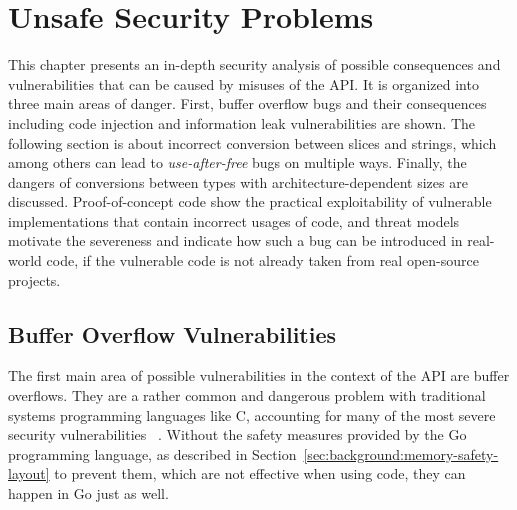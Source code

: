 
\chapter{Unsafe Security Problems}\label{ch:unsafe-security-problems}

This chapter presents an in-depth security analysis of possible consequences and vulnerabilities that can be caused by
misuses of the \unsafe{} \acrshort{API}.
It is organized into three main areas of danger.
First, buffer overflow bugs and their consequences including code injection and information leak vulnerabilities are
shown.
The following section is about incorrect conversion between slices and strings, which among others can lead to
\textit{use-after-free} bugs on multiple ways.
Finally, the dangers of conversions between types with architecture-dependent sizes are discussed.
Proof-of-concept code show the practical exploitability of vulnerable implementations that contain incorrect usages of
\unsafe{} code, and threat models motivate the severeness and indicate how such a bug can be introduced in real-world
code, if the vulnerable code is not already taken from real open-source projects.





\section{Buffer Overflow Vulnerabilities}\label{sec:unsafe-security-problems:buffer-overflow}

The first main area of possible vulnerabilities in the context of the \unsafe{} \acrshort{API} are buffer overflows.
They are a rather common and dangerous problem with traditional systems programming languages like C, accounting for
many of the most severe security vulnerabilities~\cite{larochelle2001} .
Without the safety measures provided by the Go programming language, as described in
Section~\ref{sec:background:memory-safety-layout} to prevent them, which are not effective when using \unsafe{} code,
they can happen in Go just as well.



